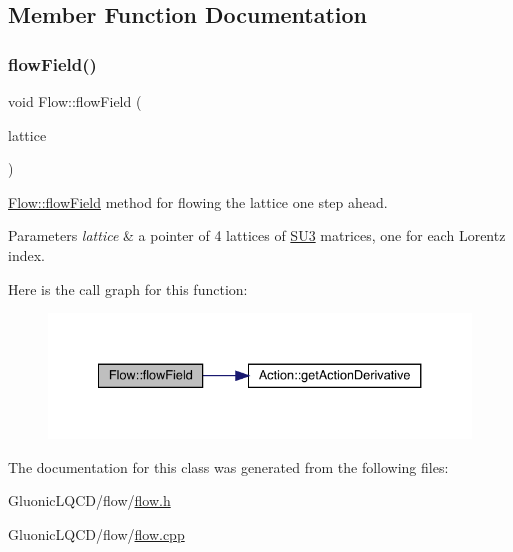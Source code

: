 \subsection{Member Function Documentation}
\mbox{\label{class_flow_a284b490ddedc9cf5d0f2ab0660c328f6}} 
\subsubsection{\texorpdfstring{flowField()}{flowField()}}
{\footnotesize\ttfamily void Flow\+::flow\+Field (\begin{DoxyParamCaption}\item[{\mbox{\hyperlink{class_lattice}{Lattice}}$<$ \mbox{\hyperlink{class_s_u3}{S\+U3}} $>$ $\ast$}]{lattice }\end{DoxyParamCaption})}



\mbox{\hyperlink{class_flow_a284b490ddedc9cf5d0f2ab0660c328f6}{Flow\+::flow\+Field}} method for flowing the lattice one step ahead. 


\begin{DoxyParams}{Parameters}
{\em lattice} & a pointer of 4 lattices of \mbox{\hyperlink{class_s_u3}{S\+U3}} matrices, one for each Lorentz index. \\
\hline
\end{DoxyParams}
Here is the call graph for this function\+:
\nopagebreak
\begin{figure}[H]
\begin{center}
\leavevmode
\includegraphics[width=334pt]{class_flow_a284b490ddedc9cf5d0f2ab0660c328f6_cgraph}
\end{center}
\end{figure}


The documentation for this class was generated from the following files\+:\begin{DoxyCompactItemize}
\item 
Gluonic\+L\+Q\+C\+D/flow/\mbox{\hyperlink{flow_8h}{flow.\+h}}\item 
Gluonic\+L\+Q\+C\+D/flow/\mbox{\hyperlink{flow_8cpp}{flow.\+cpp}}\end{DoxyCompactItemize}
